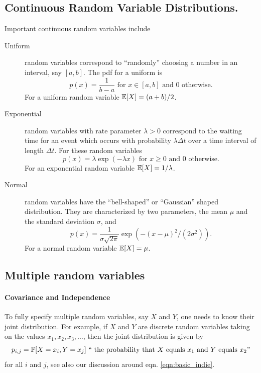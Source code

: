 \subsection{Continuous Random Variable Distributions.}
Important continuous random variables include
\begin{description}
\item[Uniform] random variables correspond to ``randomly'' choosing a number in an interval, say $[a,b]$. The pdf for a uniform is 
\begin{equation}
p(x)=\frac{1}{b-a} \mbox{ for }x\in[a,b]\mbox{ and } 0 \mbox{ otherwise.}
\end{equation}
For a uniform random variable $\E[X]=(a+b)/2$.
\item[Exponential] random variables with rate parameter $\lambda>0$ correspond to the waiting time for an event which occurs with probability $\lambda \Delta t$ over a time interval of length $\Delta t$. For these random variables
\begin{equation}
p(x)= \lambda \exp(-\lambda x) \mbox{ for }x\ge 0 \mbox{ and } 0 \mbox{ otherwise.}
\end{equation}
For an exponential random variable $\E[X]=1/\lambda$. 

\item[Normal] random variables have the ``bell-shaped'' or ``Gaussian'' shaped distribution. They are characterized by two parameters, the mean $\mu$ and the standard deviation $\sigma$, and
\begin{equation}
p(x)=\frac{1}{\sigma\sqrt{2\pi}}\exp(-(x-\mu)^2/(2\sigma^2)).
\end{equation}
For a normal random variable $\E[X]=\mu$. 
\end{description}

\subsection*{Multiple random variables}

\paragraph{Covariance and Independence} To fully specify multiple random variables, say $X$ and $Y$, one needs to know their joint distribution. For example, if $X$ and $Y$ are discrete random variables taking on the values $x_1,x_2,x_3,\dots$, then the joint distribution is given by 
\begin{equation}
p_{i,j}=\P[X=x_i,Y=x_j] \mbox{ `` the probability that $X$ equals $x_1$ and $Y$ equals $x_2$''}
\end{equation}
for all $i$ and $j$, see also our discussion around eqn. \eqref{eqn:basic_indie}.

